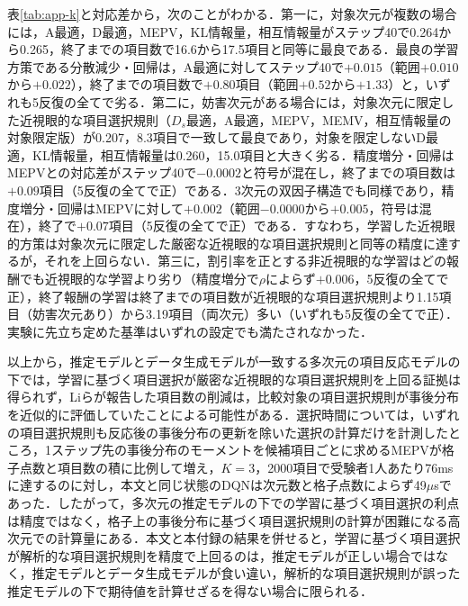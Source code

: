 \documentclass[paper]{ieicej}
\begin{document}
表\ref{tab:app-k}と対応差から，次のことがわかる．第一に，対象次元が複数の場合には，A最適，D最適，MEPV，KL情報量，相互情報量がステップ40で0.264から0.265，終了までの項目数で16.6から17.5項目と同等に最良である．最良の学習方策である分散減少・回帰は，A最適に対してステップ40で$+0.015$（範囲$+0.010$から$+0.022$），終了までの項目数で$+0.80$項目（範囲$+0.52$から$+1.33$）と，いずれも5反復の全てで劣る．第二に，妨害次元がある場合には，対象次元に限定した近視眼的な項目選択規則（$D_s$最適，A最適，MEPV，MEMV，相互情報量の対象限定版）が0.207，8.3項目で一致して最良であり，対象を限定しないD最適，KL情報量，相互情報量は0.260，15.0項目と大きく劣る．精度増分・回帰はMEPVとの対応差がステップ40で$-0.0002$と符号が混在し，終了までの項目数は$+0.09$項目（5反復の全てで正）である．3次元の双因子構造でも同様であり，精度増分・回帰はMEPVに対して$+0.002$（範囲$-0.0000$から$+0.005$，符号は混在），終了で$+0.07$項目（5反復の全てで正）である．すなわち，学習した近視眼的方策は対象次元に限定した厳密な近視眼的な項目選択規則と同等の精度に達するが，それを上回らない．第三に，割引率を正とする非近視眼的な学習はどの報酬でも近視眼的な学習より劣り（精度増分で$\rho$によらず$+0.006$，5反復の全てで正），終了報酬の学習は終了までの項目数が近視眼的な項目選択規則より1.15項目（妨害次元あり）から3.19項目（両次元）多い（いずれも5反復の全てで正）．実験に先立ち定めた基準はいずれの設定でも満たされなかった．

以上から，推定モデルとデータ生成モデルが一致する多次元の項目反応モデルの下では，学習に基づく項目選択が厳密な近視眼的な項目選択規則を上回る証拠は得られず，Liらが報告した項目数の削減は，比較対象の項目選択規則が事後分布を近似的に評価していたことによる可能性がある．選択時間については，いずれの項目選択規則も反応後の事後分布の更新を除いた選択の計算だけを計測したところ，1ステップ先の事後分布のモーメントを候補項目ごとに求めるMEPVが格子点数と項目数の積に比例して増え，$K=3$，2000項目で受験者1人あたり76msに達するのに対し，本文と同じ状態のDQNは次元数と格子点数によらず49$\mu$sであった．したがって，多次元の推定モデルの下での学習に基づく項目選択の利点は精度ではなく，格子上の事後分布に基づく項目選択規則の計算が困難になる高次元での計算量にある．本文と本付録の結果を併せると，学習に基づく項目選択が解析的な項目選択規則を精度で上回るのは，推定モデルが正しい場合ではなく，推定モデルとデータ生成モデルが食い違い，解析的な項目選択規則が誤った推定モデルの下で期待値を計算せざるを得ない場合に限られる．
\end{document}
